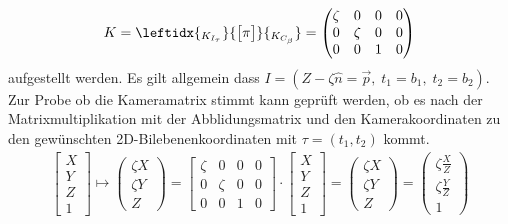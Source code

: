 		\begin{gather}
		K = \leftidx{_{K_{I_\tau}}}{\begin{bmatrix}
			\pi
			\end{bmatrix}}{_{K_{C_\beta}}} 
		= 
		\begin{pmatrix}
		\zeta&0&0&0\\
		0&\zeta&0&0\\
		0&0&1&0\\
		\end{pmatrix}
		\end{gather}
		 aufgestellt werden. Es gilt allgemein dass $I = (Z - \zeta \hat{n} = \vec{p}, \; t_1 = b_1, \; t_2 = b_2)$. Zur Probe ob die Kameramatrix stimmt kann geprüft werden, ob es nach der Matrixmultiplikation mit der Abblidungsmatrix und den Kamerakoordinaten zu den gewünschten 2D-Bilebenenkoordinaten mit $\tau = (t_1, t_2)$ kommt.
		\begin{gather}
\begin{bmatrix}
X\\Y\\Z\\1
\end{bmatrix} \mapsto
\begin{pmatrix}
\zeta X\\ \zeta Y\\ Z
\end{pmatrix}
=
\begin{bmatrix}
\zeta&0&0&0\\
0&\zeta&0&0\\
0&0&1&0
\end{bmatrix}
\cdot
\begin{bmatrix}
X\\Y\\Z\\1
\end{bmatrix}
=
\begin{pmatrix}
\zeta X\\ \zeta Y\\Z
\end{pmatrix}
=
\begin{pmatrix}
\zeta \frac{X}{Z}\\ \zeta \frac{Y}{Z}\\1
\end{pmatrix}
\end{gather}
%
%		
